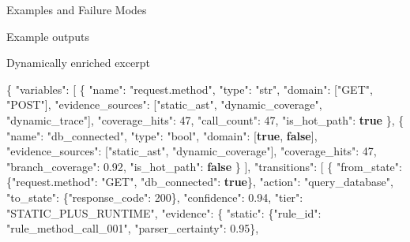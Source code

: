 \documentclass[
  ignorenonframetext,
]{beamer}
\newenvironment{Shaded}{}{}
\newcommand{\DataTypeTok}[1]{\textcolor[rgb]{0.56,0.13,0.00}{#1}}
\newcommand{\DecValTok}[1]{\textcolor[rgb]{0.25,0.63,0.44}{#1}}
\newcommand{\FloatTok}[1]{\textcolor[rgb]{0.25,0.63,0.44}{#1}}
\newcommand{\FunctionTok}[1]{\textcolor[rgb]{0.02,0.16,0.49}{#1}}
\newcommand{\KeywordTok}[1]{\textcolor[rgb]{0.00,0.44,0.13}{\textbf{#1}}}
\newcommand{\OtherTok}[1]{\textcolor[rgb]{0.00,0.44,0.13}{#1}}
\newcommand{\StringTok}[1]{\textcolor[rgb]{0.25,0.44,0.63}{#1}}
\begin{document}
\begin{frame}[fragile]{Examples and Failure Modes}
\begin{block}{Example outputs}
\begin{block}{Dynamically enriched excerpt}
\begin{Shaded}
\begin{Highlighting}[]
\FunctionTok{\{}
  \DataTypeTok{"variables"}\FunctionTok{:} \OtherTok{[}
    \FunctionTok{\{}
      \DataTypeTok{"name"}\FunctionTok{:} \StringTok{"request.method"}\FunctionTok{,} \DataTypeTok{"type"}\FunctionTok{:} \StringTok{"str"}\FunctionTok{,} \DataTypeTok{"domain"}\FunctionTok{:} \OtherTok{[}\StringTok{"GET"}\OtherTok{,} \StringTok{"POST"}\OtherTok{]}\FunctionTok{,}
      \DataTypeTok{"evidence\_sources"}\FunctionTok{:} \OtherTok{[}\StringTok{"static\_ast"}\OtherTok{,} \StringTok{"dynamic\_coverage"}\OtherTok{,} \StringTok{"dynamic\_trace"}\OtherTok{]}\FunctionTok{,}
      \DataTypeTok{"coverage\_hits"}\FunctionTok{:} \DecValTok{47}\FunctionTok{,} \DataTypeTok{"call\_count"}\FunctionTok{:} \DecValTok{47}\FunctionTok{,} \DataTypeTok{"is\_hot\_path"}\FunctionTok{:} \KeywordTok{true}
    \FunctionTok{\}}\OtherTok{,}
    \FunctionTok{\{}
      \DataTypeTok{"name"}\FunctionTok{:} \StringTok{"db\_connected"}\FunctionTok{,} \DataTypeTok{"type"}\FunctionTok{:} \StringTok{"bool"}\FunctionTok{,} \DataTypeTok{"domain"}\FunctionTok{:} \OtherTok{[}\KeywordTok{true}\OtherTok{,} \KeywordTok{false}\OtherTok{]}\FunctionTok{,}
      \DataTypeTok{"evidence\_sources"}\FunctionTok{:} \OtherTok{[}\StringTok{"static\_ast"}\OtherTok{,} \StringTok{"dynamic\_coverage"}\OtherTok{]}\FunctionTok{,}
      \DataTypeTok{"coverage\_hits"}\FunctionTok{:} \DecValTok{47}\FunctionTok{,} \DataTypeTok{"branch\_coverage"}\FunctionTok{:} \FloatTok{0.92}\FunctionTok{,} \DataTypeTok{"is\_hot\_path"}\FunctionTok{:} \KeywordTok{false}
    \FunctionTok{\}}
  \OtherTok{]}\FunctionTok{,}
  \DataTypeTok{"transitions"}\FunctionTok{:} \OtherTok{[}
    \FunctionTok{\{}
      \DataTypeTok{"from\_state"}\FunctionTok{:} \FunctionTok{\{}\DataTypeTok{"request.method"}\FunctionTok{:} \StringTok{"GET"}\FunctionTok{,} \DataTypeTok{"db\_connected"}\FunctionTok{:} \KeywordTok{true}\FunctionTok{\},}
      \DataTypeTok{"action"}\FunctionTok{:} \StringTok{"query\_database"}\FunctionTok{,}
      \DataTypeTok{"to\_state"}\FunctionTok{:} \FunctionTok{\{}\DataTypeTok{"response\_code"}\FunctionTok{:} \DecValTok{200}\FunctionTok{\},}
      \DataTypeTok{"confidence"}\FunctionTok{:} \FloatTok{0.94}\FunctionTok{,} \DataTypeTok{"tier"}\FunctionTok{:} \StringTok{"STATIC\_PLUS\_RUNTIME"}\FunctionTok{,}
      \DataTypeTok{"evidence"}\FunctionTok{:} \FunctionTok{\{}
        \DataTypeTok{"static"}\FunctionTok{:} \FunctionTok{\{}\DataTypeTok{"rule\_id"}\FunctionTok{:} \StringTok{"rule\_method\_call\_001"}\FunctionTok{,} \DataTypeTok{"parser\_certainty"}\FunctionTok{:} \FloatTok{0.95}\FunctionTok{\},}

\end{Highlighting}
\end{Shaded}
\end{block}
\end{block}
\end{frame}
\end{document}
